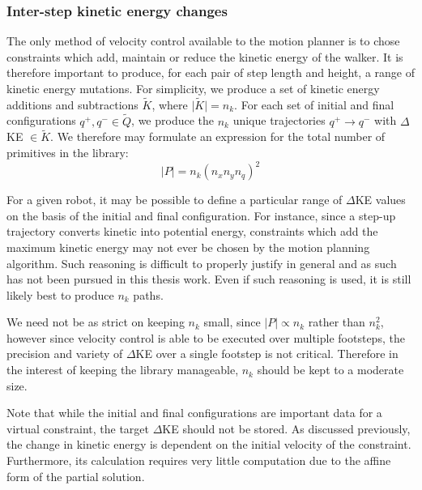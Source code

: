 \subsubsection{Inter-step kinetic energy changes}
The only method of velocity control available to the motion planner is to chose constraints which add, maintain or reduce the kinetic energy of the walker. It is therefore important to produce, for each pair of step length and height, a range of kinetic energy mutations. For simplicity, we produce a set of kinetic energy additions and subtractions $\tilde{K}$, where $\lvert\tilde{K}\rvert = n_k$. For each set of initial and final configurations $q^+,q^- \in \tilde{Q}$, we produce the $n_k$ unique trajectories $q^+ \to q^-$ with $\Delta$KE $\in \tilde{K}$. We therefore may formulate an expression for the total number of primitives in the library:
\begin{equation}
	\lvert P \rvert = n_k\left( n_xn_yn_q\right)^2
\end{equation}

For a given robot, it may be possible to define a particular range of $\Delta$KE values on the basis of the initial and final configuration. For instance, since a step-up trajectory converts kinetic into potential energy, constraints which add the maximum kinetic energy may not ever be chosen by the motion planning algorithm. Such reasoning is difficult to properly justify in general and as such has not been pursued in this thesis work. Even if such reasoning is used, it is still likely best to produce $n_k$ paths.

We need not be as strict on keeping $n_k$ small, since $\lvert P \rvert \propto n_k$ rather than $n_k^2$, however since velocity control is able to be executed over multiple footsteps, the precision and variety of $\Delta$KE over a single footstep is not critical. Therefore in the interest of keeping the library manageable, $n_k$ should be kept to a moderate size.

Note that while the initial and final configurations are important data for a virtual constraint, the target $\Delta$KE should not be stored. As discussed previously, the change in kinetic energy is dependent on the initial velocity of the constraint. Furthermore, its calculation requires very little computation due to the affine form of the partial solution.

